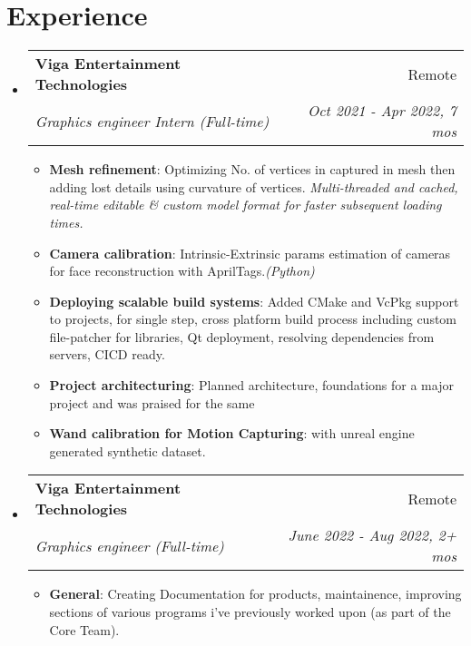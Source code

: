 \documentclass[a4paper,10pt]{article}
\makeatletter
\newcommand{\resumeItem}[2]{
  \item\small{
    \textbf{#1}{: #2 \vspace{-2pt}}
  }
}
\newcommand{\resumeSubheading}[4]{
  \vspace{-1pt}\item
    \begin{tabular*}{0.97\textwidth}{l@{\extracolsep{\fill}}r}
      \textbf{#1} & #2 \\
      \textit{#3} & \textit{#4} \\
    \end{tabular*}\vspace{-5pt}
}
\newcommand{\resumeSubHeadingListStart}{\begin{itemize}[leftmargin=*]}
\newcommand{\resumeSubHeadingListEnd}{\end{itemize}}
\newcommand{\resumeItemListStart}{\begin{itemize}}
\newcommand{\resumeItemListEnd}{\end{itemize}\vspace{-5pt}}
\makeatother
\begin{document}
\section{Experience}
  \resumeSubHeadingListStart
    \resumeSubheading{Viga Entertainment Technologies}{Remote}
    {Graphics engineer Intern (Full-time)}{Oct 2021 - Apr 2022, 7 mos}
    \resumeItemListStart
        \resumeItem{Mesh refinement}
          {Optimizing No. of vertices in captured in mesh then adding lost details using curvature of vertices. \textit{Multi-threaded and cached, real-time editable \& custom model format for faster subsequent loading times.}}
        \resumeItem{Camera calibration}
          {Intrinsic-Extrinsic params estimation of cameras for face reconstruction with AprilTags.\textit{(Python)}}
        \resumeItem{Deploying scalable build systems}
          {Added CMake and VcPkg support to projects, for single step, cross platform build process including custom file-patcher for libraries, Qt deployment, resolving dependencies from servers, CICD ready.}
        \resumeItem{Project architecturing}
          {Planned architecture, foundations for a major project and was praised for the same}
        \resumeItem{Wand calibration for Motion Capturing}{with unreal engine generated synthetic dataset.}
      \resumeItemListEnd
    \resumeSubheading{Viga Entertainment Technologies}{Remote}
    {Graphics engineer (Full-time)}{June 2022 - Aug 2022, 2+ mos}
      \resumeItemListStart
        \resumeItem{General}{Creating Documentation for products, maintainence, improving sections of various programs i've previously worked upon (as part of the Core Team).}
      \resumeItemListEnd
\resumeSubHeadingListEnd

\vspace{-7pt}
\end{document}
